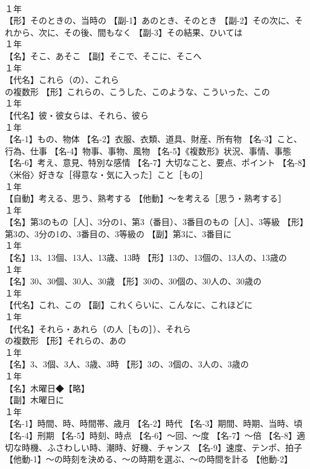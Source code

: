 \documentclass[8pt]{extreport}
\begin{document}
\begin{CJK}{UTF8}{min}
\\	１年	
\\	【形】そのときの、当時の 【副-1】あのとき、そのとき 【副-2】その次に、それから、次に、その後、間もなく 【副-3】その結果、ひいては
\\	１年	
\\	【名】そこ、あそこ 【副】そこで、そこに、そこへ
\\	１年	
\\	【代名】これら（の）、これら
\\	の複数形 【形】これらの、こうした、このような、こういった、この
\\	１年	
\\	【代名】彼・彼女らは、それら、彼ら
\\	１年	
\\	【名-1】もの、物体 【名-2】衣服、衣類、道具、財産、所有物 【名-3】こと、行為、仕事 【名-4】物事、事物、風物 【名-5】《複数形》状況、事情、事態 【名-6】考え、意見、特別な感情 【名-7】大切なこと、要点、ポイント 【名-8】〈米俗〉好きな［得意な・気に入った］こと［もの］
\\	１年	
\\	【自動】考える、思う、熟考する 【他動】～を考える［思う・熟考する］
\\	１年	
\\	【名】第3のもの［人］、3分の1、第3（番目）、3番目のもの［人］、3等級 【形】第3の、3分の1の、3番目の、3等級の 【副】第3に、3番目に
\\	１年	
\\	【名】13、13個、13人、13歳、13時 【形】13の、13個の、13人の、13歳の
\\	１年	
\\	【名】30、30個、30人、30歳 【形】30の、30個の、30人の、30歳の
\\	１年	
\\	【代名】これ、この 【副】これくらいに、こんなに、これほどに
\\	１年	
\\	【代名】それら・あれら（の人［もの］）、それら
\\	の複数形 【形】それらの、あの
\\	１年	
\\	【名】3、3個、3人、3歳、3時 【形】3の、3個の、3人の、3歳の
\\	１年	
\\	【名】木曜日◆【略】
\\	【副】木曜日に
\\	１年	
\\	【名-1】時間、時、時間帯、歳月 【名-2】時代 【名-3】期間、時期、当時、頃 【名-4】刑期 【名-5】時刻、時点 【名-6】～回、～度 【名-7】～倍 【名-8】適切な時機、ふさわしい時、潮時、好機、チャンス 【名-9】速度、テンポ、拍子 【他動-1】～の時刻を決める、～の時期を選ぶ、～の時間を計る 【他動-2】

\end{CJK}
\end{document}
